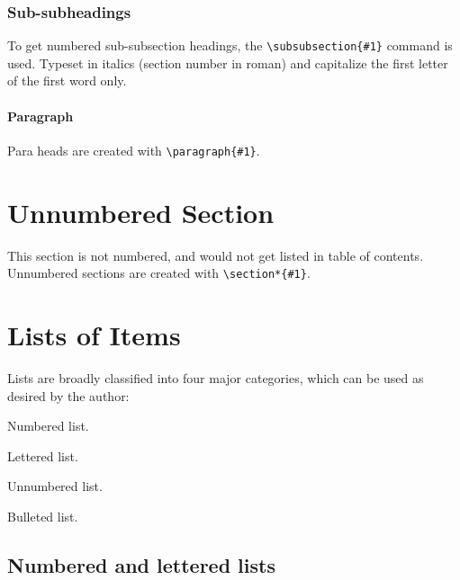 \subsubsection{Sub-subheadings}
To get numbered sub-subsection headings, the
\verb|\subsubsection{#1}| command is used. Typeset in italics
(section number in roman) and capitalize the first letter of the
first word only.

\paragraph{Paragraph} Para heads are created with \verb|\paragraph{#1}|.

\section*{Unnumbered Section}
This section is not numbered, and would not get listed in table of contents.
Unnumbered sections are created with \verb|\section*{#1}|.

\section{Lists of Items}
Lists are broadly classified into four major categories, which can be
used as desired by the author:

\begin{alphlist}[(d)]
\item Numbered list.
\item Lettered list.
\item Unnumbered list.
\item Bulleted list.
\end{alphlist}

\subsection{Numbered and lettered lists}

